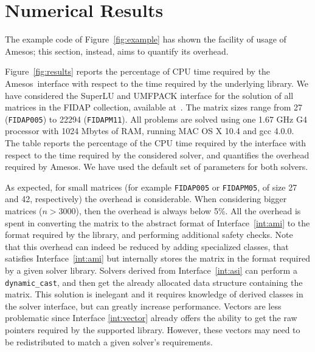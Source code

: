 \documentclass[acmtocl]{acmtrans2m}
\newcommand{\amesos}{{\sc Amesos}}
\begin{document}
\section{Numerical Results}
\label{sec:numerical}

The example code of Figure~\ref{fig:example} has shown the facility of usage
of \amesos; this section, instead, aims to quantify its overhead.

Figure~\ref{fig:results} reports the percentage of CPU time required by the
\amesos\ interface with respect to the time required by the underlying
library. We have considered the SuperLU and UMFPACK interface for the solution
of all matrices in the FIDAP collection, available
at~\cite{boisvert97matrix}. The matrix sizes range from 27 
({\tt FIDAP005}) to 22294 ({\tt FIDAPM11}). All problems are solved using one
1.67 GHz G4 processor with 1024 Mbytes of RAM, running MAC OS X 10.4 and gcc
4.0.0. The table reports the percentage of the CPU time required by the
interface with respect to the time required by the considered solver, and
quantifies the overhead required by \amesos. We have used the default set of
parameters for both solvers.

As expected, for small matrices (for example \verb!FIDAP005! or \verb!FIDAPM05!, of size
27 and 42, respectively) 
the overhead is considerable. When considering bigger matrices ($n > 3000$),
then the overhead is  always below 5\%. All the overhead is spent in
converting the matrix to the abstract format of Interface~\ref{int:ami} to the
format required by the library, and performing additional safety checks.
Note that this overhead can indeed be reduced by adding specialized classes,
     that satisfies Interface~\ref{int:ami} but internally stores the matrix
     in the format required by a given solver library. Solvers derived from
     Interface~\ref{int:asi} can perform a {\tt dynamic\_cast}, and then get
     the already allocated data structure containing the matrix. This solution
     is inelegant and it requires knowledge of derived classes in the solver
     interface, but can greatly increase performance.  Vectors are less
     problematic since Interface \ref{int:vector} already offers the ability
     to get the raw pointers required by the supported library. However, these
     vectors may need to be redistributed to match a given solver's
     requirements.
\end{document}
